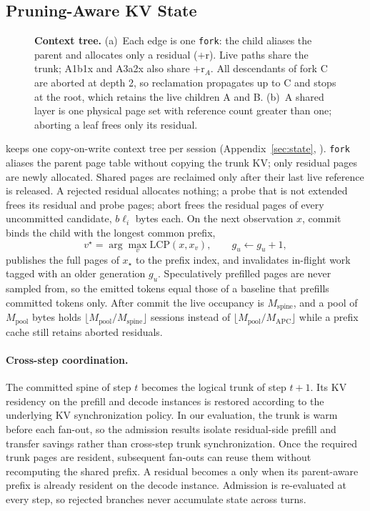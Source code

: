 \subsection{Pruning-Aware KV State}
\label{sec:kvstate}

\begin{figure}[t]
\centering
\resizebox{\textwidth}{!}{}
\caption{\textbf{Context tree.}
(a)~Each edge is one \texttt{fork}: the child aliases the parent and allocates only a residual ($+$r).
Live paths share the trunk; A1b1x and A3a2x also share $+$r$_A$.
All descendants of fork C are aborted at depth 2, so reclamation propagates up to C and stops at the root, which retains the live children A and B.
(b)~A shared layer is one physical page set with reference count greater than one; aborting a leaf frees only its residual.}
\label{fig:tree}
\end{figure}

\sys keeps one copy-on-write context tree per session (Appendix~\ref{sec:state}, ).
\texttt{fork} aliases the parent page table without copying the trunk KV; only residual pages are newly allocated.
Shared pages are reclaimed only after their last live reference is released.
A rejected residual allocates nothing; a probe that is not extended frees its residual and probe pages; abort frees the residual pages of every uncommitted candidate, $b\ell_i$ bytes each.
On the next observation $x$, commit binds the child with the longest common prefix,
\begin{equation}
\label{eq:lcp}
v^\star=\arg\max_{v}\mathrm{LCP}(x,x_v),\qquad g_u\leftarrow g_u+1,
\end{equation}
publishes the full pages of $x_\star$ to the prefix index, and invalidates in-flight work tagged with an older generation $g_u$.
Speculatively prefilled pages are never sampled from, so the emitted tokens equal those of a baseline that prefills committed tokens only.
After commit the live occupancy is $M_{\mathrm{spine}}$, and a pool of $M_{\mathrm{pool}}$ bytes holds $\lfloor M_{\mathrm{pool}}/M_{\mathrm{spine}}\rfloor$ sessions instead of $\lfloor M_{\mathrm{pool}}/M_{\mathrm{APC}}\rfloor$ while a prefix cache still retains aborted residuals.

\paragraph{Cross-step coordination.}
The committed spine of step $t$ becomes the logical trunk of step $t{+}1$.
Its KV residency on the prefill and decode instances is restored according to the underlying KV synchronization policy.
In our evaluation, the trunk is warm before each fan-out, so the admission results isolate residual-side prefill and transfer savings rather than cross-step trunk synchronization.
Once the required trunk pages are resident, subsequent fan-outs can reuse them without recomputing the shared prefix.
A residual becomes a \Hit{} only when its parent-aware prefix is already resident on the decode instance.
Admission is re-evaluated at every step, so rejected branches never accumulate state across turns.

